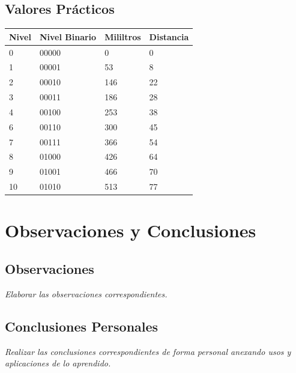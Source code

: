 \documentclass[11pt]{scrartcl}
\newcommand{\indicacion}[1]{\noindent\textit{\small #1}}
\begin{document}
\subsection{Valores Prácticos}
\begin{center}
\begin{tabular}{|p{4cm}|p{4cm}|p{4cm}|p{4cm}|}
\hline
\textbf{Nivel}& \textbf{Nivel Binario} & \textbf{Mililtros} & \textbf{Distancia}\\
\hline
0 & 00000 & 0 & 0 \\[4px]
\hline
1 & 00001 &53 &8 \\ [4px]
\hline
2 & 00010 & 146 & 22 \\[4px] 
\hline
3 & 00011 &186 & 28\\ [4px]
\hline
4 &00100 & 253 & 38 \\[4px]
\hline
6& 00110& 300 & 45 \\[4px]
\hline
7 & 00111 & 366& 54\\ [4px]
\hline
8& 01000& 426& 64\\[4px]
\hline
9 & 01001 & 466& 70\\ [4px]
\hline
10& 01010& 513 & 77 \\[4px]

\hline
\end{tabular}
\end{center}

\section{Observaciones y Conclusiones}

\subsection{Observaciones}
\indicacion{
    Elaborar las observaciones correspondientes.
}

\subsection{Conclusiones Personales}
\indicacion{
    Realizar las conclusiones correspondientes de forma personal anexando usos y aplicaciones de lo aprendido.
}


  

    
\end{document}
